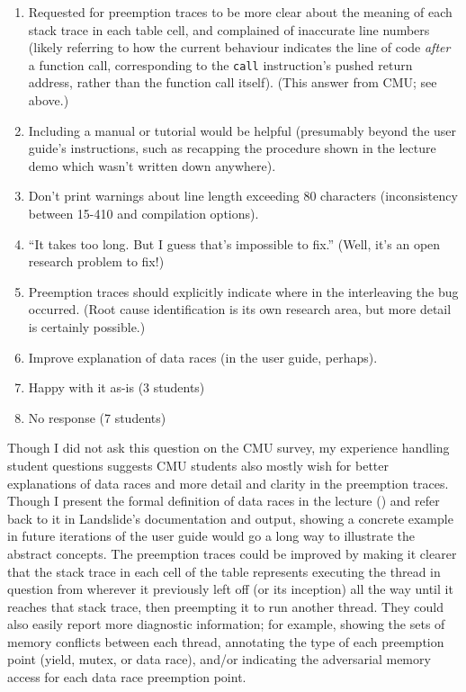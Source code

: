 \begin{enumerate}
	\item Requested for preemption traces to be more clear about the meaning of each stack trace in each table cell,
		and complained of inaccurate line numbers
		(likely referring to how the current behaviour indicates the line of code {\em after} a function call,
		corresponding to the {\tt call} instruction's pushed return address,
		rather than the function call itself). (This answer from CMU; see above.)
	\item Including a manual or tutorial would be helpful (presumably beyond the user guide's instructions, such as recapping the procedure shown in the lecture demo which wasn't written down anywhere).
	\item Don't print warnings about line length exceeding 80 characters (inconsistency between 15-410 and \psuos compilation options).
	\item ``It takes too long. But I guess that's impossible to fix.'' (Well, it's an open research problem to fix!)
	\item Preemption traces should explicitly indicate where in the interleaving the bug occurred.
		(Root cause identification is its own research area, but more detail is certainly possible.)
	\item Improve explanation of data races (in the user guide, perhaps).
	\item Happy with it as-is (3 students)
	\item No response (7 students)
\end{enumerate}

Though I did not ask this question on the CMU survey,
my experience handling student questions suggests CMU students
also mostly wish for
better explanations of data races and
more detail and clarity in the preemption traces.
Though I present the formal definition of data races in the lecture
(\sect{\ref{sec:education-pebbles-recruiting}})
and refer back to it in Landslide's documentation and output,
showing a concrete example
in future iterations of the user guide
would go a long way to illustrate the abstract concepts.
The preemption traces could be improved by making it clearer that the stack trace in each cell of the table
represents executing the thread in question from wherever it previously left off (or its inception)
all the way until it reaches that stack trace, then preempting it to run another thread.
They could also easily report more diagnostic information;
for example, showing the sets of memory conflicts between each thread,
annotating the type of each preemption point (yield, mutex, or data race),
and/or indicating the adversarial memory access for each data race preemption point.

